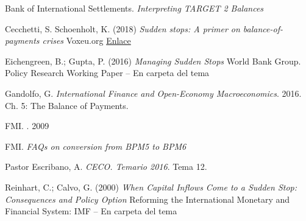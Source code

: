 \documentclass{nuevotema}
\begin{document}
Bank of International Settlements. \textit{Interpreting TARGET 2 Balances}

Cecchetti, S. Schoenholt, K. (2018) \textit{Sudden stops: A primer on balance-of-payments crises} Voxeu.org \href{https://voxeu.org/content/sudden-stops-primer-balance-payments-crises}{Enlace}

Eichengreen, B.; Gupta, P. (2016) \textit{Managing Sudden Stops} World Bank Group. Policy Research Working Paper -- En carpeta del tema


Gandolfo, G. \textit{International Finance and Open-Economy Macroeconomics}. 2016. Ch. 5: The Balance of Payments.

FMI. . 2009

FMI. \textit{FAQs on conversion from BPM5 to BPM6}

Pastor Escribano, A. \textit{CECO. Temario 2016}. Tema 12.

Reinhart, C.; Calvo, G. (2000) \textit{When Capital Inflows Come to a Sudden Stop: Consequences and Policy Option} Reforming the International Monetary and Financial System: IMF -- En carpeta del tema 
\end{document}
